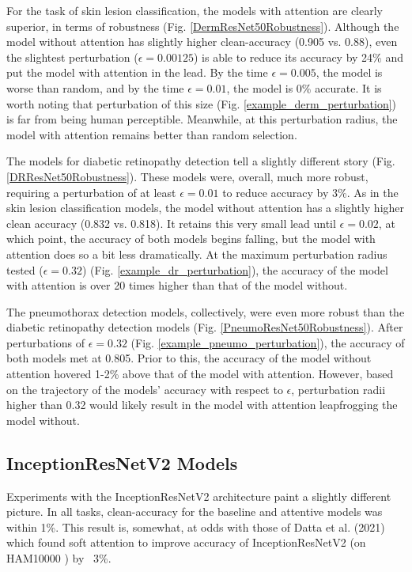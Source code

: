 \documentclass[10pt,twocolumn,letterpaper]{article}
\begin{document}
      For the task of skin lesion classification, the models with attention are clearly superior, in terms of robustness (Fig. \ref{DermResNet50Robustness}). Although the model without attention has slightly higher clean-accuracy (0.905 vs. 0.88), even the slightest perturbation ($\epsilon=0.00125$) is able to reduce its accuracy by 24\% and put the model with attention in the lead. By the time $\epsilon=0.005$, the model is worse than random, and by the time $\epsilon=0.01$, the model is 0\% accurate. It is worth noting that perturbation of this size (Fig. \ref{example_derm_perturbation}) is far from being human perceptible. Meanwhile, at this perturbation radius, the model with attention remains better than random selection.

      The models for diabetic retinopathy detection tell a slightly different story (Fig. \ref{DRResNet50Robustness}). These models were, overall, much more robust, requiring a perturbation of at least $\epsilon=0.01$ to reduce accuracy by 3\%. As in the skin lesion classification models, the model without attention has a slightly higher clean accuracy (0.832 vs. 0.818). It retains this very small lead until $\epsilon=0.02$, at which point, the accuracy of both models begins falling, but the model with attention does so a bit less dramatically. At the maximum perturbation radius tested ($\epsilon=0.32$) (Fig. \ref{example_dr_perturbation}), the accuracy of the model with attention is over 20 times higher than that of the model without.

      The pneumothorax detection models, collectively, were even more robust than the diabetic retinopathy detection models (Fig. \ref{PneumoResNet50Robustness}). After perturbations of $\epsilon=0.32$ (Fig. \ref{example_pneumo_perturbation}), the accuracy of both models met at 0.805. Prior to this, the accuracy of the model without attention hovered 1-2\% above that of the model with attention. However, based on the trajectory of the models' accuracy with respect to $\epsilon$, perturbation radii higher than 0.32 would likely result in the model with attention leapfrogging the model without.

    \subsection{InceptionResNetV2 Models}

      
      
      

      Experiments with the InceptionResNetV2 architecture paint a slightly different picture. In all tasks, clean-accuracy for the baseline and attentive models was within 1\%. This result is, somewhat, at odds with those of Datta et al. (2021) \cite{AttentionSkinCancerClassification} which found soft attention to improve accuracy of InceptionResNetV2 (on HAM10000 \cite{HAM10000}) by ~3\%.
\end{document}

